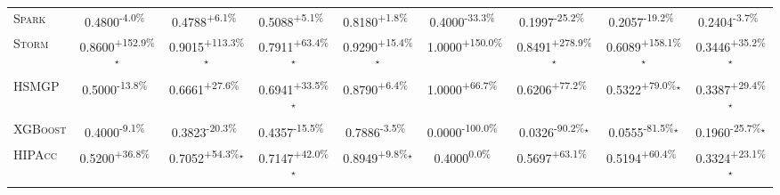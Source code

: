 \begin{table}[htbp]
\begin{tabular}{l|cccc|cccc}
\textsc{Spark} & \cellcolor{red!30}0.4800\textsuperscript{-4.0\%}$^{\,\,\,}$ & \cellcolor{green!30}0.4788\textsuperscript{+6.1\%}$^{\,\,\,}$ & \cellcolor{green!30}0.5088\textsuperscript{+5.1\%}$^{\,\,\,}$ & \cellcolor{green!30}0.8180\textsuperscript{+1.8\%}$^{\,\,\,}$ & \cellcolor{red!30}0.4000\textsuperscript{-33.3\%}$^{\,\,\,}$ & \cellcolor{red!30}0.1997\textsuperscript{-25.2\%}$^{\,\,\,}$ & \cellcolor{red!30}0.2057\textsuperscript{-19.2\%}$^{\,\,\,}$ & \cellcolor{red!30}0.2404\textsuperscript{-3.7\%}$^{\,\,\,}$ \\
\textsc{Storm} & \cellcolor{green!30}0.8600\textsuperscript{+152.9\%}$^\star$ & \cellcolor{green!30}0.9015\textsuperscript{+113.3\%}$^\star$ & \cellcolor{green!30}0.7911\textsuperscript{+63.4\%}$^\star$ & \cellcolor{green!30}0.9290\textsuperscript{+15.4\%}$^\star$ & \cellcolor{green!30}1.0000\textsuperscript{+150.0\%}$^{\,\,\,}$ & \cellcolor{green!30}0.8491\textsuperscript{+278.9\%}$^\star$ & \cellcolor{green!30}0.6089\textsuperscript{+158.1\%}$^\star$ & \cellcolor{green!30}0.3446\textsuperscript{+35.2\%}$^\star$ \\
\textsc{HSMGP} & \cellcolor{red!30}0.5000\textsuperscript{-13.8\%}$^{\,\,\,}$ & \cellcolor{green!30}0.6661\textsuperscript{+27.6\%}$^{\,\,\,}$ & \cellcolor{green!30}0.6941\textsuperscript{+33.5\%}$^\star$ & \cellcolor{green!30}0.8790\textsuperscript{+6.4\%}$^{\,\,\,}$ & \cellcolor{green!30}1.0000\textsuperscript{+66.7\%}$^{\,\,\,}$ & \cellcolor{green!30}0.6206\textsuperscript{+77.2\%}$^{\,\,\,}$ & \cellcolor{green!30}0.5322\textsuperscript{+79.0\%}$^\star$ & \cellcolor{green!30}0.3387\textsuperscript{+29.4\%}$^\star$ \\
\textsc{XGBoost} & \cellcolor{red!30}0.4000\textsuperscript{-9.1\%}$^{\,\,\,}$ & \cellcolor{red!30}0.3823\textsuperscript{-20.3\%}$^{\,\,\,}$ & \cellcolor{red!30}0.4357\textsuperscript{-15.5\%}$^{\,\,\,}$ & \cellcolor{red!30}0.7886\textsuperscript{-3.5\%}$^{\,\,\,}$ & \cellcolor{red!30}0.0000\textsuperscript{-100.0\%}$^{\,\,\,}$ & \cellcolor{red!30}0.0326\textsuperscript{-90.2\%}$^\star$ & \cellcolor{red!30}0.0555\textsuperscript{-81.5\%}$^\star$ & \cellcolor{red!30}0.1960\textsuperscript{-25.7\%}$^\star$ \\
\textsc{HIPAcc} & \cellcolor{green!30}0.5200\textsuperscript{+36.8\%}$^{\,\,\,}$ & \cellcolor{green!30}0.7052\textsuperscript{+54.3\%}$^\star$ & \cellcolor{green!30}0.7147\textsuperscript{+42.0\%}$^\star$ & \cellcolor{green!30}0.8949\textsuperscript{+9.8\%}$^\star$ & \cellcolor{red!30}0.4000\textsuperscript{0.0\%}$^{\,\,\,}$ & \cellcolor{green!30}0.5697\textsuperscript{+63.1\%}$^{\,\,\,}$ & \cellcolor{green!30}0.5194\textsuperscript{+60.4\%}$^{\,\,\,}$ & \cellcolor{green!30}0.3324\textsuperscript{+23.1\%}$^\star$ \\

\end{tabular}
\end{table}
